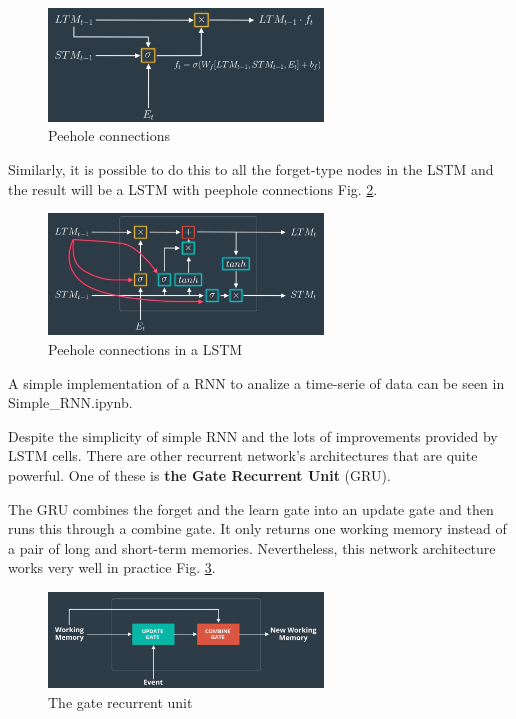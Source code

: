 \documentclass{article}
\begin{document}
\begin{figure}[ht]
    \centering
    \includegraphics[width=0.65\textwidth,height=0.65\textheight,keepaspectratio]{images/peehole.png}
    \captionsetup{justification=centering}
    \caption{Peehole connections}
    \label{fig:f15}
\end{figure}

Similarly, it is possible to do this to all the forget-type nodes in the LSTM and the result will be a LSTM with peephole connections Fig. \ref{fig:f16}.

\begin{figure}[ht]
    \centering
    \includegraphics[width=0.65\textwidth,height=0.65\textheight,keepaspectratio]{images/peehole_lstm.png}
    \captionsetup{justification=centering}
    \caption{Peehole connections in a LSTM}
    \label{fig:f16}
\end{figure}

A simple implementation of a RNN to analize a time-serie of data can be seen in Simple\_RNN.ipynb.

Despite the simplicity of simple RNN and the lots of improvements provided by LSTM cells. There are other recurrent network's architectures that are quite powerful. One of these is \textbf{the Gate Recurrent Unit} (GRU). 

The GRU combines the forget and the learn gate into an update gate and then runs this through a combine gate. It only returns one working memory instead of a pair of long and short-term memories. Nevertheless, this network architecture works very well in practice Fig. \ref{fig:f17}.

\begin{figure}[ht]
    \centering
    \includegraphics[width=0.65\textwidth,height=0.65\textheight,keepaspectratio]{images/gru.png}
    \captionsetup{justification=centering}
    \caption{The gate recurrent unit}
    \label{fig:f17}
\end{figure}
\end{document}
